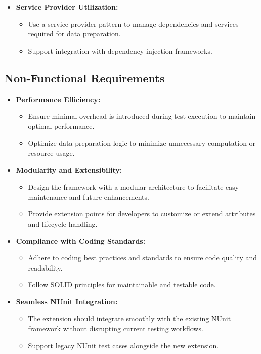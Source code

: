 \begin{itemize}
    \item \textbf{Service Provider Utilization:}
    \begin{itemize}
        \item Use a service provider pattern to manage dependencies and services required for data preparation.
        \item Support integration with dependency injection frameworks.
    \end{itemize}
\end{itemize}

\subsection*{Non-Functional Requirements}

\begin{itemize}
    \item \textbf{Performance Efficiency:}
    \begin{itemize}
        \item Ensure minimal overhead is introduced during test execution to maintain optimal performance.
        \item Optimize data preparation logic to minimize unnecessary computation or resource usage.
    \end{itemize}
    
    \item \textbf{Modularity and Extensibility:}
    \begin{itemize}
        \item Design the framework with a modular architecture to facilitate easy maintenance and future enhancements.
        \item Provide extension points for developers to customize or extend attributes and lifecycle handling.
    \end{itemize}
    
    \item \textbf{Compliance with Coding Standards:}
    \begin{itemize}
        \item Adhere to coding best practices and standards to ensure code quality and readability.
        \item Follow SOLID principles for maintainable and testable code.
    \end{itemize}
    
    \item \textbf{Seamless NUnit Integration:}
    \begin{itemize}
        \item The extension should integrate smoothly with the existing NUnit framework without disrupting current testing workflows.
        \item Support legacy NUnit test cases alongside the new extension.
    \end{itemize}
\end{itemize}

